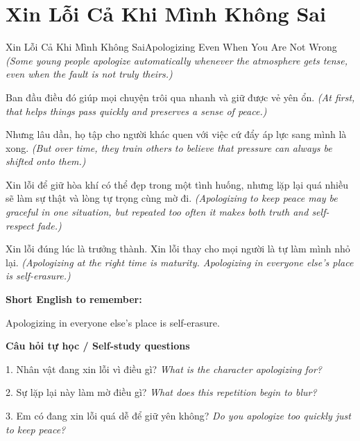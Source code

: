 \section{Xin Lỗi Cả Khi Mình Không Sai}
\begin{truyen}{Xin Lỗi Cả Khi Mình Không Sai}{Apologizing Even When You Are Not Wrong}
\textit{(Some young people apologize automatically whenever the atmosphere gets tense, even when the fault is not truly theirs.)}

Ban đầu điều đó giúp mọi chuyện trôi qua nhanh và giữ được vẻ yên ổn.
\textit{(At first, that helps things pass quickly and preserves a sense of peace.)}

Nhưng lâu dần, họ tập cho người khác quen với việc cứ đẩy áp lực sang mình là xong.
\textit{(But over time, they train others to believe that pressure can always be shifted onto them.)}

Xin lỗi để giữ hòa khí có thể đẹp trong một tình huống, nhưng lặp lại quá nhiều sẽ làm sự thật và lòng tự trọng cùng mờ đi.
\textit{(Apologizing to keep peace may be graceful in one situation, but repeated too often it makes both truth and self-respect fade.)}

\end{truyen}

\begin{baihoc}
Xin lỗi đúng lúc là trưởng thành. Xin lỗi thay cho mọi người là tự làm mình nhỏ lại.
\textit{(Apologizing at the right time is maturity. Apologizing in everyone else's place is self-erasure.)}
\end{baihoc}

\begin{ghinhoanh}
\textbf{Short English to remember:}

Apologizing in everyone else's place is self-erasure.

\end{ghinhoanh}

\begin{tuhocnhanh}
\textbf{Câu hỏi tự học / Self-study questions}

1. Nhân vật đang xin lỗi vì điều gì? \textit{What is the character apologizing for?}

2. Sự lặp lại này làm mờ điều gì? \textit{What does this repetition begin to blur?}

3. Em có đang xin lỗi quá dễ để giữ yên không? \textit{Do you apologize too quickly just to keep peace?}
\end{tuhocnhanh}
\ngancach

